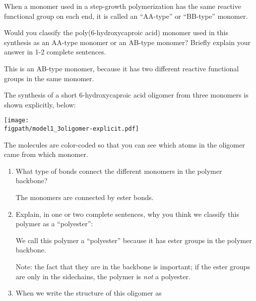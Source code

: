 \begin{activity}
\begin{infobox}
	When a monomer used in a step-growth polymerization has the same reactive functional group on each end, it is called an ``AA-type'' or ``BB-type'' monomer.

\end{infobox}

\begin{ctqs}
		
		\question Would you classify the poly(6-hydroxycaproic acid) monomer used in this synthesis as an AA-type monomer or an AB-type monomer?  Briefly explain your answer in 1-2 complete sentences.
			
				\begin{solution}[1.75in]
					This is an AB-type monomer, because it has two different reactive functional groups in the same monomer.
				\end{solution}
		
		\question The synthesis of a short 6-hydroxycaproic acid oligomer from three monomers is shown explicitly, below: \label{\labelbase:ctq:6hcpa-oligomer}
	
\vspace{0.25in}	\centerline{\texttt{[image: \\figpath/model1\_3oligomer-explicit.pdf]}}
The molecules are color-coded so that you can see which atoms in the oligomer came from which monomer.
		
		\begin{enumerate}
		
			\item What type of bonds connect the different monomers in the polymer backbone?
			
				\begin{solution}[1.5in]
					The monomers are connected by ester bonds.
				\end{solution}
		
			\item Explain, in one or two complete sentences, why you think we classify this polymer as a ``polyester'':
			
				\begin{solution}[2in]
					We call this polymer a ``polyester'' because it has ester groups in the polymer backbone.
					
					Note: the fact that they are in the backbone is important; if the ester groups are only in the sidechains, the polymer is \emph{not} a polyester.
				\end{solution}
	
			\item When we write the structure of this oligomer as
	

\end{enumerate}
\end{ctqs}
\end{activity}
